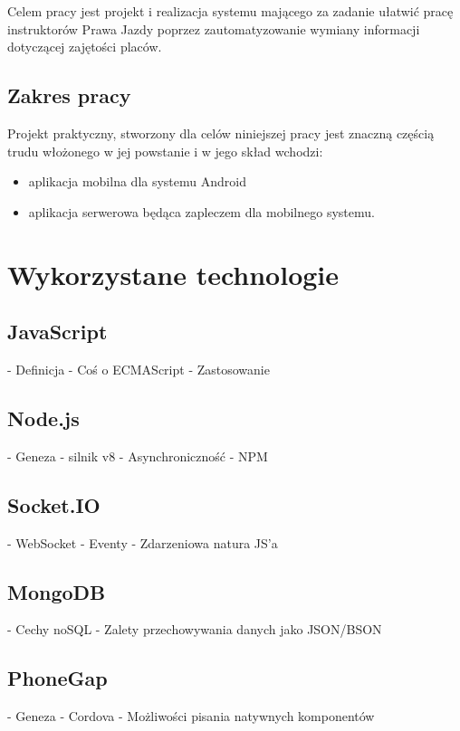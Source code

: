 \documentclass[twoside,a4paper]{book}
\begin{document}
Celem pracy jest projekt i realizacja systemu mającego za zadanie ułatwić pracę instruktorów Prawa Jazdy poprzez zautomatyzowanie wymiany informacji dotyczącej zajętości placów.


\section{Zakres pracy}

Projekt praktyczny, stworzony dla celów niniejszej pracy jest znaczną częścią trudu włożonego w jej powstanie i w jego skład wchodzi:

\begin{itemize}
	\item aplikacja mobilna dla systemu Android
	\item aplikacja serwerowa będąca zapleczem dla mobilnego systemu.
\end{itemize}




\chapter{Wykorzystane technologie}
\section{JavaScript}
- Definicja
- Coś o ECMAScript
- Zastosowanie

\section{Node.js}
- Geneza
- silnik v8
- Asynchroniczność
- NPM

\section{Socket.IO}
- WebSocket
- Eventy
- Zdarzeniowa natura JS'a

\section{MongoDB}
- Cechy noSQL
- Zalety przechowywania danych jako JSON/BSON

\section{PhoneGap}
- Geneza
- Cordova
- Możliwości pisania natywnych komponentów
\end{document}
